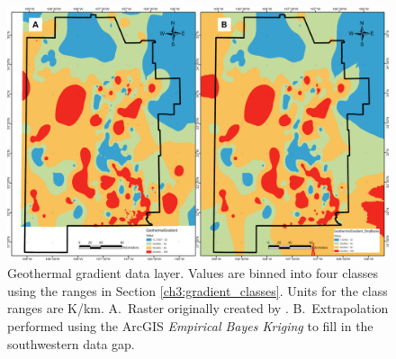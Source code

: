 \begin{figure}[H]
\centering
\includegraphics[width=\linewidth]{templates/images/Figure-PFA_Geothermal_Gradient_sidebyside.png}
\caption[Geothermal gradient data layer]{Geothermal gradient data layer. Values are binned into four classes using the ranges in Section \ref{ch3:gradient_classes}. Units for the class ranges are K/km. A.\ Raster originally created by \protect\citet{bielicki_hydrogeolgic_2015}. B.\ Extrapolation performed using the ArcGIS \textit{Empirical Bayes Kriging} to fill in the southwestern data gap.}
\label{fig:feat_pfa_geotherm_gradient}
\end{figure}
